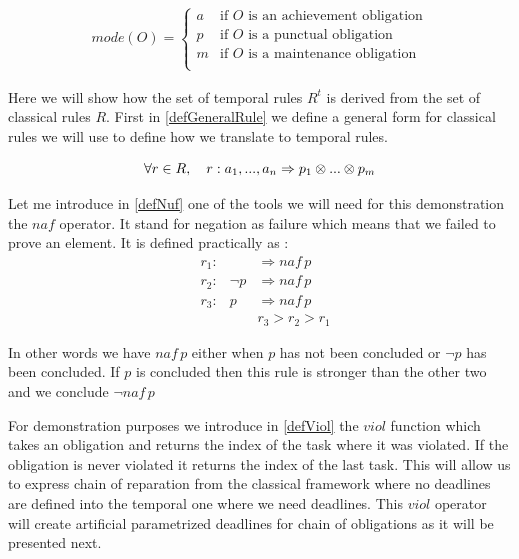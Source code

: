 \documentclass[10pt]{report}
\begin{document}
\begin{gather}
mode(O) = \begin{cases}
a & \text{if $O$ is an achievement obligation}\\
p & \text{if $O$ is a punctual obligation}\\
m & \text{if $O$ is a maintenance obligation}\\
\end{cases}
\end{gather}

Here we will show how the set of temporal rules $R^{t}$ is derived from the set of classical rules $R$. First in \ref{defGeneralRule} we define a general form for classical rules we will use to define how we translate to temporal rules.

\begin{equation} \label{defGeneralRule}
\forall r \in R, \quad r :  a_{1}, ..., a_{n} \Rightarrow p_{1} \otimes ... \otimes p_{m} \\
\end{equation}

Let me introduce in \ref{defNuf} one of the tools we will need for this demonstration the $naf$ operator. It stand for negation as failure which means that we failed to prove an element. It is defined practically as : 
\begin{equation}\label{defnaf}
\begin{aligned} 
&r_{1} :& &\Rightarrow naf\,p \\
&r_{2} :& \neg p &\Rightarrow naf\,p \\
&r_{3} :& p &\Rightarrow naf\,p \\
& & &r_{3} > r_{2} > r_{1} 
\end{aligned}
\end{equation}

In other words we have $naf\,p$ either when $p$ has not been concluded or $\neg p$ has been concluded. If $p$ is concluded then this rule is stronger than the other two and we conclude $\neg naf\,p$

For demonstration purposes we introduce in \ref{defViol} the $viol$ function which takes an obligation and returns the index of the task where it was violated. If the obligation is never violated it returns the index of the last task. This will allow us to express chain of reparation from the classical framework where no deadlines are defined into the temporal one where we need deadlines. This $viol$ operator will create artificial parametrized deadlines for chain of obligations as it will be presented next.
\end{document}
